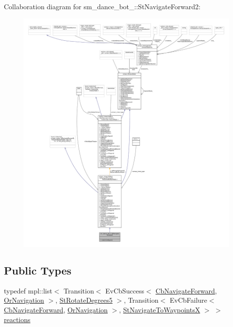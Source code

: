 Collaboration diagram for sm\+\_\+dance\+\_\+bot\+\_\+:\+:St\+Navigate\+Forward2\+:
\nopagebreak
\begin{figure}[H]
\begin{center}
\leavevmode
\includegraphics[width=350pt]{structsm__dance__bot__2_1_1StNavigateForward2__coll__graph}
\end{center}
\end{figure}
\subsection*{Public Types}
\begin{DoxyCompactItemize}
\item 
typedef mpl\+::list$<$ Transition$<$ Ev\+Cb\+Success$<$ \hyperlink{classcl__move__base__z_1_1CbNavigateForward}{Cb\+Navigate\+Forward}, \hyperlink{classsm__dance__bot__2_1_1OrNavigation}{Or\+Navigation} $>$, \hyperlink{structsm__dance__bot__2_1_1StRotateDegrees5}{St\+Rotate\+Degrees5} $>$, Transition$<$ Ev\+Cb\+Failure$<$ \hyperlink{classcl__move__base__z_1_1CbNavigateForward}{Cb\+Navigate\+Forward}, \hyperlink{classsm__dance__bot__2_1_1OrNavigation}{Or\+Navigation} $>$, \hyperlink{structsm__dance__bot__2_1_1StNavigateToWaypointsX}{St\+Navigate\+To\+WaypointsX} $>$ $>$ \hyperlink{structsm__dance__bot__2_1_1StNavigateForward2_a5d4da6dd126fd94069809d50866bf08f}{reactions}
\end{DoxyCompactItemize}
